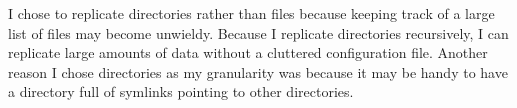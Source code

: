 \documentclass[12pt]{article}
\begin{document}
I chose to replicate directories rather than files
because keeping track of a large list of files may become unwieldy.
Because I replicate
directories recursively, I can replicate large amounts
of data without a cluttered configuration file.
Another reason I chose directories as my granularity was because it may be
handy to have a directory full of symlinks pointing to other directories.
\end{document}

